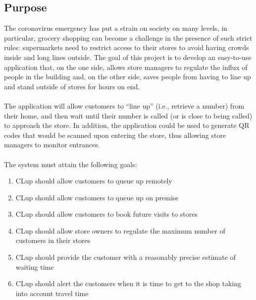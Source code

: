 \subsection{Purpose}
The coronavirus emergency has put a strain on society on many levels, in  particular,  grocery  shopping can  become  a  challenge  in  the presence  of  such  strict  rules: supermarkets  need to  restrict  access  to  their  stores  to  avoid having  crowds  inside and long  lines outside. The  goal  of  this  project  is  to  develop  an  easy-to-use  application  that,  on  the  one  side,  allows  store managers  to  regulate  the  influx  of  people  in  the  building  and,  on  the  other  side,  saves  people  from having to line up and stand outside of stores for hours on end. \\\\
The application will allow customers to “line up” (i.e., retrieve a number) from their home, and then wait  until  their  number  is  called  (or  is  close  to  being  called)  to  approach  the  store.  In  addition,  the application could be used to generate QR codes that would be scanned upon entering the store, thus allowing store managers to monitor entrances.\\\\
The system must attain the following goals:

\begin{enumerate}[label=G\arabic*]
	\item CLup should allow customers to queue up remotely
	\item CLup should allow customers to queue up on premise
	\item CLup should allow customers to book future visits to stores
	\item CLup should allow store owners to regulate the maximum number of customers in their stores
	\item CLup should provide the customer with a reasonably precise estimate of waiting time
	\item CLup should alert the customers when it is time to get to the shop taking into account travel time
\end{enumerate}


